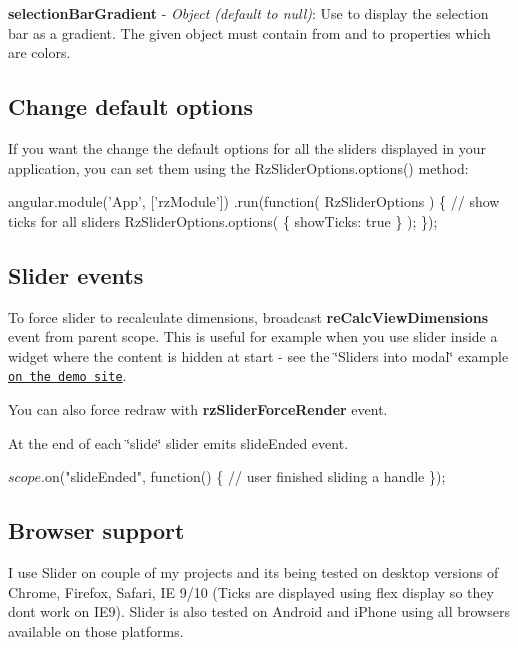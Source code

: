 {\bfseries selection\+Bar\+Gradient} -\/ {\itshape Object (default to null)}\+: Use to display the selection bar as a gradient. The given object must contain {\ttfamily from} and {\ttfamily to} properties which are colors.

\subsection*{Change default options}

If you want the change the default options for all the sliders displayed in your application, you can set them using the {\ttfamily Rz\+Slider\+Options.\+options()} method\+: 
\begin{DoxyCode}
angular.module('App', ['rzModule'])
    .run(function( RzSliderOptions ) \{
        // show ticks for all sliders
        RzSliderOptions.options( \{ showTicks: true \} );
    \});
\end{DoxyCode}


\subsection*{Slider events}

To force slider to recalculate dimensions, broadcast {\bfseries re\+Calc\+View\+Dimensions} event from parent scope. This is useful for example when you use slider inside a widget where the content is hidden at start -\/ see the \char`\"{}\+Sliders into modal\char`\"{} example \href{http://angular-slider.github.io/angularjs-slider}{\tt on the demo site}.

You can also force redraw with {\bfseries rz\+Slider\+Force\+Render} event.

At the end of each \char`\"{}slide\char`\"{} slider emits {\ttfamily slide\+Ended} event.


\begin{DoxyCode}
$scope.$on("slideEnded", function() \{
     // user finished sliding a handle
\});
\end{DoxyCode}


\subsection*{Browser support}

I use Slider on couple of my projects and it\textquotesingle{}s being tested on desktop versions of Chrome, Firefox, Safari, IE 9/10 (Ticks are displayed using flex display so they don\textquotesingle{}t work on I\+E9). Slider is also tested on Android and i\+Phone using all browsers available on those platforms.


